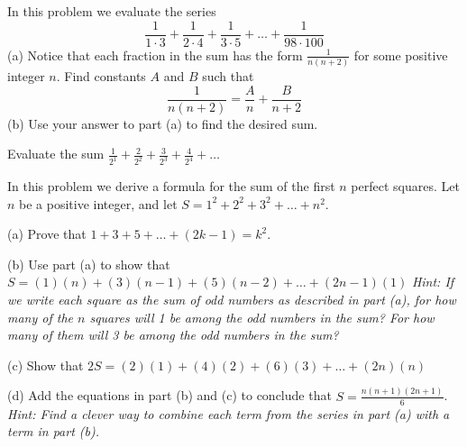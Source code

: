 \documentclass[12pt]{exam}
\begin{document}
\begin{questions}
\question[12]
In this problem we evaluate the series
\[ \frac{1}{1 \cdot 3} + \frac{1}{2 \cdot 4} + \frac{1}{3 \cdot 5} + \dots + \frac{1}{98 \cdot 100} \]
(a) Notice that each fraction in the sum has the form $\frac{1}{n(n+2)}$ for some positive integer $n$. Find constants $A$ and $B$ such that
\[ \frac{1}{n(n+2)} = \frac{A}{n} + \frac{B}{n+2} \]
\vspace*{4cm}
(b) Use your answer to part (a) to find the desired sum.
\vspace*{4cm}

\newpage

\question[12]
Evaluate the sum $\frac{1}{2^1} + \frac{2}{2^2} + \frac{3}{2^3} + \frac{4}{2^4} + \dots$
\vspace*{5cm}

\newpage

\question[16]
In this problem we derive a formula for the sum of the first $n$ perfect squares. Let $n$ be a positive integer, and let $S = 1^2 + 2^2 + 3^2 + \dots + n^2$.

(a) Prove that $1 + 3 + 5 + \dots + (2k-1) = k^2$.
\vspace*{4cm}

(b) Use part (a) to show that $S = (1)(n) + (3)(n-1) + (5)(n-2) + \dots + (2n-1)(1)$
\textit{Hint: If we write each square as the sum of odd numbers as described in part (a), for how many of the $n$ squares will 1 be among the odd numbers in the sum? For how many of them will 3 be among the odd numbers in the sum?}
\vspace*{4cm}

(c) Show that $2S = (2)(1) + (4)(2) + (6)(3) + \dots + (2n)(n)$
\vspace*{4cm}

(d) Add the equations in part (b) and (c) to conclude that $S = \frac{n(n+1)(2n+1)}{6}$.
\textit{Hint: Find a clever way to combine each term from the series in part (a) with a term in part (b).}
\vspace*{4cm}


\end{questions}
\end{document}
